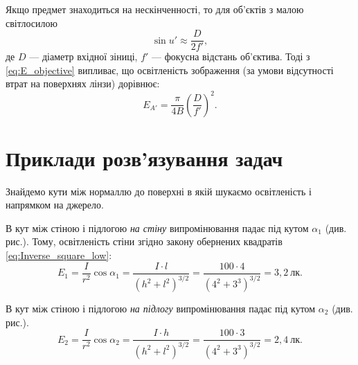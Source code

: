 \begin{enumerate}[label*={\textcolor{themecolordark}{\ding{90}}}]
	      Якщо предмет знаходиться на нескінченності, то для об'єктів з малою світлосилою
	      \begin{equation*}
		      \sin u' \approx \frac{D}{2f'},
	      \end{equation*}
	      де $D$ --- діаметр вхідної зіниці, $f'$ --- фокусна відстань об’єктива. Тоді з \eqref{eq:E_objective}  випливає, що освітленість  зображення (за умови відсутності втрат на поверхнях лінзи) дорівнює:
	      \begin{equation}\label{}
		      E_{A'} = \frac{\pi}{4B} \left( \frac{D}{f'}\right)^2.
	      \end{equation}


\end{enumerate}

\section{Приклади розв’язування задач}



\begin{solutionexample}

	Знайдемо кути між нормаллю до поверхні в якій шукаємо освітленість і напрямком на джерело.

	\begin{center}
		
	\end{center}

	В кут між стіною і підлогою \emph{на стіну} випромінювання падає під кутом $\alpha_1$ (див. рис.).
	Тому, освітленість стіни згідно закону обернених квадратів \eqref{eq:Inverse_square_low}:
	\begin{equation*}
		E_1 = \frac{I}{r^2}\cos\alpha_1 = \frac{I\cdot l}{(h^2 + l^2)^{3/2}} = \frac{100\cdot4}{(4^2 + 3^3)^{3/2}} = 3,2\ \text{лк}.
	\end{equation*}

	В кут між стіною і підлогою \emph{на підлогу} випромінювання падає під кутом $\alpha_2$ (див. рис.).
	\begin{equation*}
		E_2 = \frac{I}{r^2}\cos\alpha_2 = \frac{I\cdot h}{(h^2 + l^2)^{3/2}} = \frac{100\cdot3}{(4^2 + 3^3)^{3/2}} = 2,4\ \text{лк}.
	\end{equation*}


\end{solutionexample}

